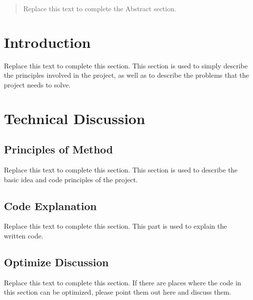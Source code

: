 \documentclass[a4paper, utk8]{ctexart}
\begin{document}
    \maketitle

    \renewcommand{\abstractname}{\large \textbf{Abstract}}
    \begin{abstract}
        Replace this text to complete the Abstract section.
	
    \end{abstract}
    
    \section{Introduction}
    
    Replace this text to complete this section. This section is used to simply describe the principles involved in the project, as well as to describe the problems that the project needs to solve.
    
    \section{Technical Discussion}
    
    \subsection{Principles of Method}
    
    Replace this text to complete this section. This section is used to describe the basic idea and code principles of the project.
    
    \subsection{Code Explanation}
    
    Replace this text to complete this section. This part is used to explain the written code.
    
    \subsection{Optimize Discussion}
    
    Replace this text to complete this section. If there are places where the code in this section can be optimized, please point them out here and discuss them.
    
\end{document}
